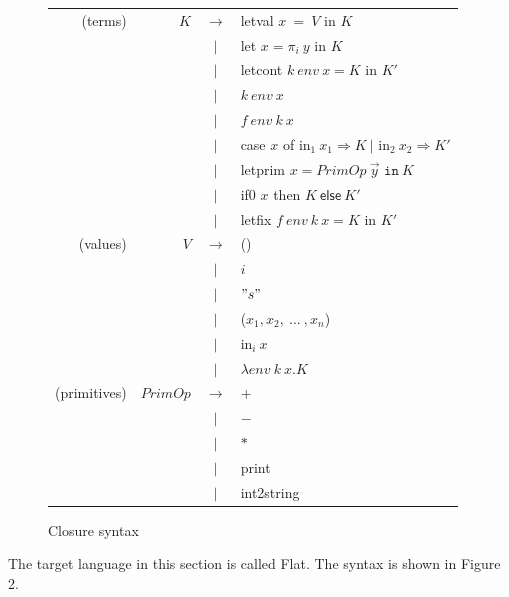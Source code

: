 \documentclass{article}
\theoremstyle{definition}
\theoremstyle{remark}
\numberwithin{equation}{section}
\begin{document}
\begin{figure}[!ht]
  \centering
\begin{tabular}{rrcl}
(terms) & $K$ & $\to$ & \textsf{letval }$x\ =\ V$ \textsf{ in } $K$ \\
        &     & $|$ & \textsf{let }$x = \pi _i\ y$\textsf{ in }$K$\\
        &     & $|$ & \textsf{letcont }$k\ env\ x = K$\textsf{ in }$K'$\\
        &     & $|$ &  $k\ env\ x$ \\
        &     & $|$ & $f\ env\ k\ x$ \\
        &     & $|$ & \textsf{case} $x$ \textsf{of in}$_1\ x_1 \Rightarrow K
                    \ |$ \textsf{in}$_2\ x_2 \Rightarrow K'$\\
        &     & $|$ & \textsf{letprim} $x=PrimOp\ \vec{y}
         \texttt{ in}\ K$\\
        &     & $|$ &\textsf{if0} $x$ \textsf{then} $K\ \textsf{else}\ K'$\\
        &     & $|$ &\textsf{letfix }$f\ env\ k\ x=K$\textsf{ in }$K'$\\

(values) & $V$ & $\to$ & () \\
        &     & $|$ & $i$\\
        &     & $|$ & $"s"$\\
        &     & $|$ & ($x_1,x_2,\ ...\ , x_n$)\\
        &     & $|$ & \textsf{in}$_i\ x$\\
        &     & $|$ &  $\lambda env\ k\ x.K$ \\

(primitives) & $PrimOp$ & $\to$ & $+$ \\
        &     & $|$ & $-$\\
        &     & $|$ & $*$\\
        &     & $|$ & \textsf{print}\\
        &     & $|$ & \textsf{int2string}\\
\end{tabular}
  \caption{Closure syntax}
  \label{fig-sub}
\end{figure}

The target language in this section is called Flat. The syntax is shown in Figure 2.
\end{document}
